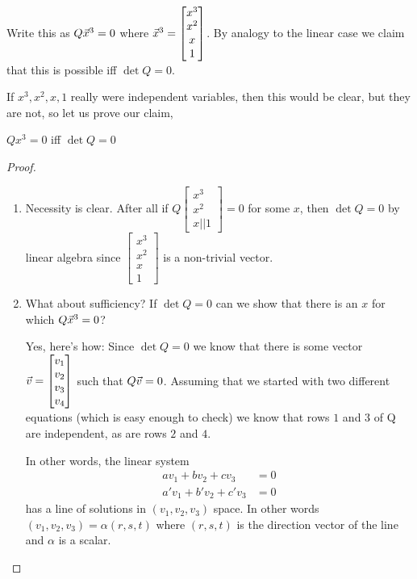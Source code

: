 Write this as $Q\vec{x}^3 = 0$ where $\vec{x}^3 =
\begin{bmatrix}
  x^3 \\ x^2 \\ x \\ 1
\end{bmatrix}
$. By analogy to the linear case we claim that this is possible iff
$\det Q = 0$.

If $x^3, x^2, x, 1$ really were independent variables, then this would
be clear, but they are not, so let us prove our claim,
\begin{claim}
  $Qx^3 = 0$ iff $\det Q = 0$
\end{claim}
\begin{proof}
  \begin{enumerate}
  \item Necessity is clear. After all if $Q
    \begin{bmatrix}
      x^3 \\ x^2 \\ x || 1
    \end{bmatrix} = 0
$ for some $x$, then $\det Q = 0$ by linear algebra since $
\begin{bmatrix}
  x^3 \\ x^2 \\ x \\ 1
\end{bmatrix}
$ is a non-trivial vector.
\item What about sufficiency? If $\det Q = 0$ can we show that there
  is an $x$ for which $Q\vec{x}^3 = 0$?

  Yes, here's how: Since $\det Q = 0$ we know that there is some
  vector $\vec{v} =
  \begin{bmatrix}
    v_1 \\ v_2 \\ v_3 \\ v_4
  \end{bmatrix}
$ such that $Q\vec{v} = 0$. Assuming that we started with two different
equations (which is easy enough to check) we know that rows $1$ and
$3$ of Q are independent, as are rows $2$ and $4$.

In other words, the linear system
\begin{align*}
  av_1 + bv_2 + cv_3 &= 0 \\
  a'v_1 + b'v_2 + c'v_3 &= 0
\end{align*}
has a line of solutions in $(v_1, v_2, v_3)$ space. In other words
$(v_1, v_2, v_3) = \alpha(r, s, t)$ where $(r, s, t)$ is the direction
vector of the line and $\alpha$ is a scalar.


\end{enumerate}
\end{proof}
